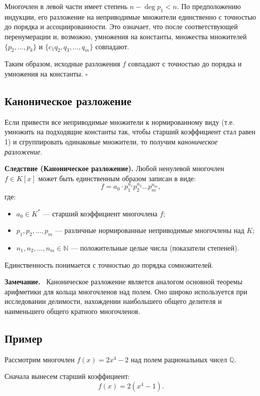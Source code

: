 \documentclass[a4paper,12pt]{article}
\newcommand{\myremark}{\textbf{Замечание.}\ }
\theoremstyle{definition}
\theoremstyle{plain}
\theoremstyle{remark}
\begin{document}
	Многочлен в левой части имеет степень \( n - \deg p_1 < n \). По предположению индукции, его разложение на неприводимые множители единственно с точностью до порядка и ассоциированности. Это означает, что после соответствующей перенумерации и, возможно, умножения на константы, множества множителей \( \{p_2, \dots, p_k\} \) и \( \{c_1 q_2, q_3, \dots, q_m\} \) совпадают.
	
	Таким образом, исходные разложения \( f \) совпадают с точностью до порядка и умножения на константы. \hfill \(\square\)
	
	\subsection{Каноническое разложение}
	
	Если привести все неприводимые множители к нормированному виду (т.е. умножить на подходящие константы так, чтобы старший коэффициент стал равен 1) и сгруппировать одинаковые множители, то получим \textit{каноническое разложение}.
	
	\medskip
	\noindent \textbf{Следствие (Каноническое разложение).}
	Любой ненулевой многочлен \( f \in K[x] \) может быть единственным образом записан в виде:
	\[
	f = a_0 \cdot p_1^{n_1} p_2^{n_2} \dots p_m^{n_m},
	\]
	где:
	\begin{itemize}
		\item \( a_0 \in K^* \) — старший коэффициент многочлена \( f \);
		\item \( p_1, p_2, \dots, p_m \) — различные нормированные неприводимые многочлены над \( K \);
		\item \( n_1, n_2, \dots, n_m \in \mathbb{N} \) — положительные целые числа (показатели степеней).
	\end{itemize}
	Единственность понимается с точностью до порядка сомножителей.
	
	\myremark
	Каноническое разложение является аналогом основной теоремы арифметики для кольца многочленов над полем. Оно широко используется при исследовании делимости, нахождении наибольшего общего делителя и наименьшего общего кратного многочленов.
	
	\subsection{Пример}
	
	Рассмотрим многочлен \( f(x) = 2x^4 - 2 \) над полем рациональных чисел \( \mathbb{Q} \).
	
	Сначала вынесем старший коэффициент:
	\[
	f(x) = 2(x^4 - 1).
	\]
	
\end{document}
